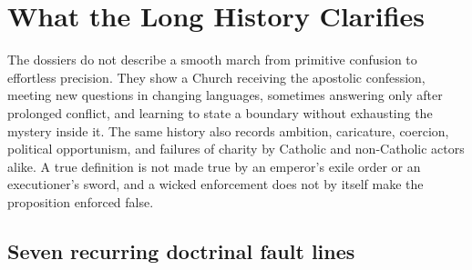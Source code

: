 \section{What the Long History Clarifies}

The dossiers do not describe a smooth march from primitive confusion to effortless precision. They show a Church receiving the apostolic confession, meeting new questions in changing languages, sometimes answering only after prolonged conflict, and learning to state a boundary without exhausting the mystery inside it. The same history also records ambition, caricature, coercion, political opportunism, and failures of charity by Catholic and non-Catholic actors alike. A true definition is not made true by an emperor's exile order or an executioner's sword, and a wicked enforcement does not by itself make the proposition enforced false.

\subsection{Seven recurring doctrinal fault lines}

